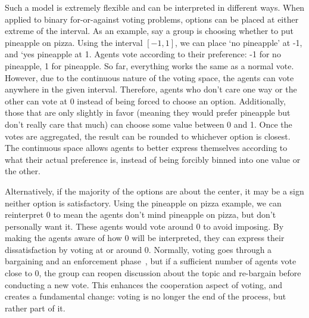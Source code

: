Such a model is extremely flexible and can be interpreted in different ways.
When applied to binary for-or-against voting problems, options can be placed at either
extreme of the interval.
As an example, say a group is choosing whether to put pineapple on pizza.
Using the interval $[-1, 1]$, we can place `no pineapple' at -1, and `yes pineapple 
at 1.
Agents vote according to their preference: -1 for no pineapple, 1 for pineapple.
So far, everything works the same as a normal vote.
However, due to the continuous nature of the voting space, the agents can vote
anywhere in the given interval.
Therefore, agents who don't care one way or the other can vote at 0 instead of being
forced to choose an option.
Additionally, those that are only slightly in favor (meaning they would prefer
pineapple but don't really care that much) can choose some value between 0 and 1.
Once the votes are aggregated, the result can be rounded to whichever option is
closest.
The continuous space allows agents to better express themselves according to what
their actual preference is, instead of being forcibly binned into one value or the
other.

Alternatively, if the majority of the options are about the center, it may be a sign
neither option is satisfactory.
Using the pineapple on pizza example, we can reinterpret 0 to mean the agents don't
mind pineapple on pizza, but don't personally want it.
These agents would vote around 0 to avoid imposing.
By making the agents aware of how 0 will be interpreted, they can express their
dissatisfaction by voting at or around 0.
Normally, voting goes through a bargaining and an enforcement
phase~\cite{Fearon1998}, but if a sufficient number of agents vote close to 0, the
group can reopen discussion about the topic and re-bargain before conducting a new vote.
This enhances the cooperation aspect of voting, and creates a fundamental change:
voting is no longer the end of the process, but rather part of it.

